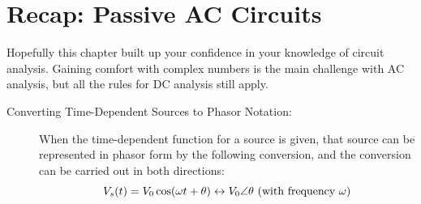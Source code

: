 \section{Recap: Passive AC Circuits}
Hopefully this chapter built up your confidence in your knowledge of circuit analysis. Gaining comfort with complex numbers is the main challenge with AC analysis, but all the rules for DC analysis still apply.
\begin{description}
\item[Converting Time-Dependent Sources to Phasor Notation:] When the time-dependent function for a source is given, that source can be represented in phasor form by the following conversion, and the conversion can be carried out in both directions:
$$
V_s(t) = V_0\cos(\omega t + \theta) \leftrightarrow V_0\angle\theta \textnormal{ (with frequency }\omega\textnormal{)}
$$
\end{description}
